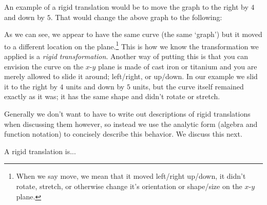 \documentclass{ximera}
\begin{document}
    An example of a rigid translation would be to move the graph to the right by $4$ and down by $5$. That would change the above graph to the following:
    
    \begin{minipage}{\textwidth}
        \begin{center}
        \end{center}
    \end{minipage}
    
    As we can see, we appear to have the same curve (the same `graph') but it moved to a different location on the plane.\footnote{%
        When we say move, we mean that it moved left/right up/down, it didn't rotate, stretch, or otherwise change it's orientation or shape/size on the $x$-$y$ plane.%
        } 
    This is how we know the transformation we applied is a \textit{rigid transformation}. Another way of putting this is that you can envision the curve on the $x$-$y$ plane is made of cast iron or titanium and you are merely allowed to slide it around; left/right, or up/down. In our example we slid it to the right by $4$ units and down by $5$ units, but the curve itself remained exactly as it was; it has the same shape and didn't rotate or stretch.

    Generally we don't want to have to write out descriptions of rigid translations when discussing them however, so instead we use the analytic form (algebra and function notation) to concisely describe this behavior. We discuss this next.
    
    \begin{problem}
        A rigid translation is...
        \begin{multipleChoice}
        \end{multipleChoice}
    \end{problem}
    
    
    
\end{document}
